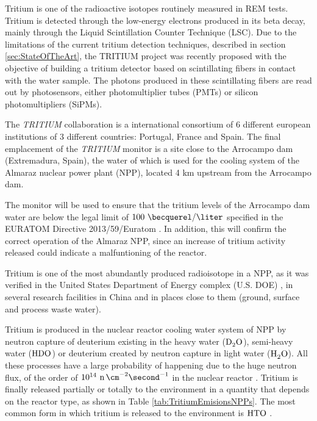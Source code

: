 Tritium is one of the radioactive isotopes routinely measured in REM tests. Tritium is detected through the low-energy electrons produced in its beta decay, mainly through the Liquid Scintillation Counter Technique (LSC). Due to the limitations of the current tritium detection techniques, described in section \ref{sec:StateOfTheArt}, the TRITIUM project was recently proposed with the objective of building a tritium detector based on scintillating fibers in contact with the water sample. The photons produced in these scintillating fibers are read out by photosensors, either photomultiplier tubes (PMTs) or silicon photomultipliers (SiPMs). 

The \textit{TRITIUM} collaboration is a international consortium of 6 different european institutions of 3 different countries: Portugal, France and Spain. The final emplacement of the \textit{TRITIUM} monitor is a site close to the Arrocampo dam (Extremadura, Spain), the water of which is used for the cooling system of the Almaraz nuclear power plant (NPP), located 4 km upstream from the Arrocampo dam.

The monitor will be used to ensure that the tritium levels of the Arrocampo dam  water are below the legal limit of $100~\becquerel/\liter$ specified in the EURATOM Directive 2013/59/Euratom \cite{100BqL}. In addition, this will confirm the correct operation of the Almaraz NPP, since an increase of tritium activity released could indicate a malfuntioning of the reactor.

Tritium is one of the most abundantly produced radioisotope in a NPP, as it was verified in the United States Department of Energy complex (U.S. DOE) \cite{FiberDetector1a, FiberDetector1b}, in several research facilities in China \cite{CommonEmissionTritium} and in places close to them (ground, surface and process waste water).

Tritium is produced in the nuclear reactor cooling water system of NPP by neutron capture of deuterium existing in the heavy water ($\ce{D_2 O}$), semi-heavy water ($\ce{H D O}$) or deuterium created by neutron capture in light water ($\ce{H_2 O}$). All these processes have a large probability of happening due to the huge neutron flux, of the order of $10^{14} ~\ce{n} \, \cm^{-2} \second^{-1}$ in the nuclear reactor \cite{CrossSeccionNeutrons}. Tritium is finally released partially or totally to the environment in a quantity that depends on the reactor type, as shown in Table \ref{tab:TritiumEmisionsNPPs}. The most common form in which tritium is released to the environment is $\ce{HTO}$ \cite{CommonEmissionTritium}.

